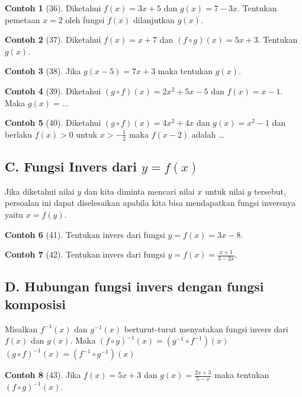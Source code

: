 \documentclass[12pt]{scrartcl}
\theoremstyle{definition}
\newtheorem{contoh}{Contoh}
\begin{document}
\begin{contoh}[36]
Diketahui $f(x) = 3x+5$ dan $g(x) = 7-3x$. Tentukan pemetaan $x=2$ oleh fungsi $f(x)$ dilanjutkan $g(x)$.
\end{contoh}

\begin{contoh}[37]
Diketahui $f(x) = x+7$ dan $(f \circ g)(x) = 5x+3$. Tentukan $g(x)$.
\end{contoh}

\begin{contoh}[38]
Jika $g(x-5) = 7x+3$ maka tentukan $g(x)$.
\end{contoh}

\begin{contoh}[39]
Diketahui $(g \circ f)(x) = 2x^2+5x-5$ dan $f(x)=x-1$. Maka $g(x) = \dots$
\end{contoh}

\begin{contoh}[40]
Diketahui $(g \circ f)(x) = 4x^2+4x$ dan $g(x) = x^2-1$ dan berlaku $f(x) > 0$ untuk $x > -\frac{1}{2}$ maka $f(x-2)$ adalah \dots
\end{contoh}

\subsection*{C. Fungsi Invers dari $y=f(x)$}
Jika diketahui nilai $y$ dan kita diminta mencari nilai $x$ untuk nilai $y$ tersebut, persoalan ini dapat diselesaikan apabila kita bisa mendapatkan fungsi inversnya yaitu $x=f(y)$. 

\begin{contoh}[41]
Tentukan invers dari fungsi $y = f(x) = 3x-8$.
\end{contoh}

\begin{contoh}[42]
Tentukan invers dari fungsi $y = f(x) = \frac{x+1}{3-2x}$.
\end{contoh}

\subsection*{D. Hubungan fungsi invers dengan fungsi komposisi}
Misalkan $f^{-1}(x)$ dan $g^{-1}(x)$ berturut-turut menyatakan fungsi invers dari $f(x)$ dan $g(x)$. Maka
$(f \circ g)^{-1}(x) = (g^{-1} \circ f^{-1})(x)$
$(g \circ f)^{-1}(x) = (f^{-1} \circ g^{-1})(x)$

\begin{contoh}[43]
Jika $f(x) = 5x+3$ dan $g(x) = \frac{2x+3}{5-x}$ maka tentukan $(f \circ g)^{-1}(x)$.
\end{contoh}
\end{document}

